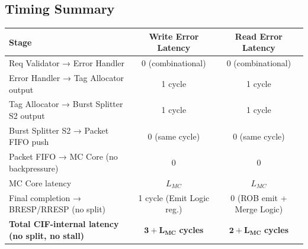 \documentclass[11pt,a4paper]{article}
\begin{document}
\subsection{Timing Summary}

\begin{center}
\begin{tabularx}{\textwidth}{L{8cm}cc}
\toprule
\textbf{Stage} & \textbf{Write Error Latency} & \textbf{Read Error Latency} \\
\midrule
Req Validator → Error Handler & 0 (combinational) & 0 (combinational) \\
Error Handler → Tag Allocator output & 1 cycle & 1 cycle \\
Tag Allocator → Burst Splitter S2 output & 1 cycle & 1 cycle \\
Burst Splitter S2 → Packet FIFO push & 0 (same cycle) & 0 (same cycle) \\
Packet FIFO → MC Core (no backpressure) & 0 & 0 \\
MC Core latency & $L_{MC}$ & $L_{MC}$ \\
Final completion → BRESP/RRESP (no split) & 1 cycle (Emit Logic reg.) & 0 (ROB emit + Merge Logic) \\
\midrule
\textbf{Total CIF-internal latency (no split, no stall)} & $\mathbf{3 + L_{MC}}$ \textbf{cycles} & $\mathbf{2 + L_{MC}}$ \textbf{cycles} \\
\bottomrule
\end{tabularx}
\end{center}
\end{document}
